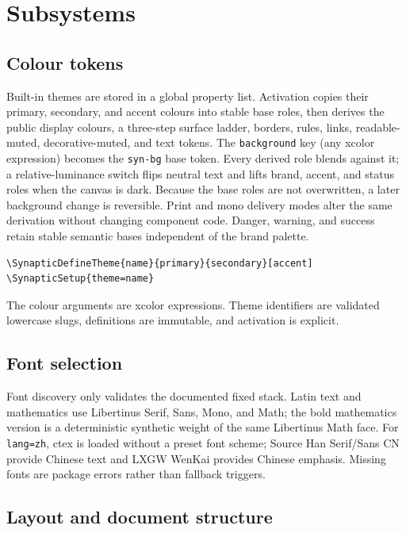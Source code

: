 \documentclass[a4paper,11pt]{scrartcl}
\begin{document}
\section{Subsystems}

\subsection{Colour tokens}

Built-in themes are stored in a global property list. Activation copies their
primary, secondary, and accent colours into stable base roles, then derives the
public display colours, a three-step surface ladder, borders, rules, links,
readable-muted, decorative-muted, and text tokens. The \texttt{background} key
(any xcolor expression) becomes the \texttt{syn-bg} base token. Every derived
role blends against it; a relative-luminance switch flips neutral text and
lifts brand, accent, and status roles when the canvas is dark. Because the base
roles are not overwritten, a later background change is reversible. Print and
mono delivery modes alter the same derivation without changing component code.
Danger, warning, and success retain stable semantic bases independent of the
brand palette.

\begin{verbatim}
\SynapticDefineTheme{name}{primary}{secondary}[accent]
\SynapticSetup{theme=name}
\end{verbatim}

The colour arguments are xcolor expressions. Theme identifiers are validated
lowercase slugs, definitions are immutable, and activation is explicit.

\subsection{Font selection}

Font discovery only validates the documented fixed stack. Latin text and
mathematics use Libertinus Serif, Sans, Mono, and Math; the bold mathematics
version is a deterministic synthetic weight of the same Libertinus Math face.
For \texttt{lang=zh},
ctex is loaded without a preset font scheme; Source Han Serif/Sans CN provide
Chinese text and LXGW WenKai provides Chinese emphasis. Missing fonts are
package errors rather than fallback triggers.

\subsection{Layout and document structure}
\end{document}
